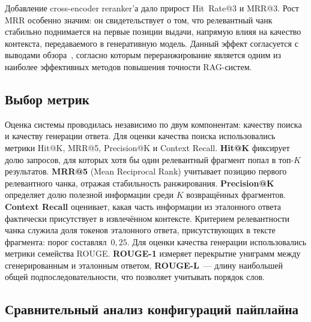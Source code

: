 \documentclass{article}
\begin{document}
\noindent Добавление cross-encoder reranker'а дало прирост
Hit~Rate@3  и MRR@3.
Рост MRR особенно значим: он свидетельствует о том, что релевантный
чанк стабильно поднимается на первые позиции выдачи, напрямую влияя
на качество контекста, передаваемого в генеративную модель.
Данный эффект согласуется с выводами обзора~\cite{3},
согласно которым переранжирование является одним из наиболее
эффективных методов повышения точности RAG-систем.



\subsection{Выбор метрик}

Оценка системы проводилась независимо по двум компонентам:
качеству поиска и качеству генерации ответа. Для оценки качества поиска использовались метрики
Hit@K, MRR@5, Precision@K и Context Recall.
\textbf{Hit@K} фиксирует долю запросов, для которых хотя бы один
релевантный фрагмент попал в топ-$K$ результатов.
\textbf{MRR@5} (Mean Reciprocal Rank) учитывает позицию первого
релевантного чанка, отражая стабильность ранжирования.
\textbf{Precision@K} определяет долю полезной информации
среди $K$ возвращённых фрагментов.
\textbf{Context Recall} оценивает, какая часть информации
из эталонного ответа фактически присутствует в извлечённом контексте.
Критерием релевантности чанка служила доля токенов эталонного ответа,
присутствующих в тексте фрагмента: порог составлял~$0{,}25$. Для оценки качества генерации использовались метрики семейства ROUGE.
\textbf{ROUGE-1} измеряет перекрытие униграмм между сгенерированным
и эталонным ответом, \textbf{ROUGE-L}~--- длину наибольшей общей
подпоследовательности, что позволяет учитывать порядок слов.


\subsection{Сравнительный анализ конфигураций пайплайна}
\end{document}
